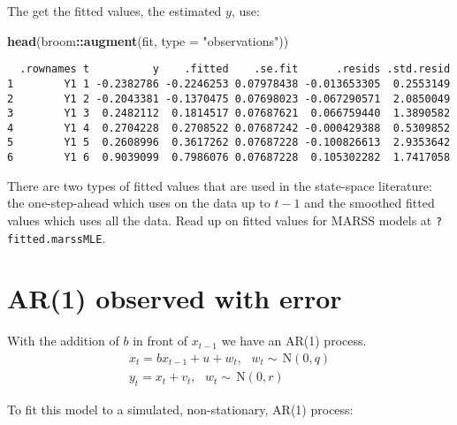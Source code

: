 \documentclass[12pt,]{book}
\newenvironment{Shaded}{\begin{snugshade}}{\end{snugshade}}
\newcommand{\DataTypeTok}[1]{\textcolor[rgb]{0.13,0.29,0.53}{#1}}
\newcommand{\KeywordTok}[1]{\textcolor[rgb]{0.13,0.29,0.53}{\textbf{#1}}}
\newcommand{\NormalTok}[1]{#1}
\newcommand{\OperatorTok}[1]{\textcolor[rgb]{0.81,0.36,0.00}{\textbf{#1}}}
\newcommand{\StringTok}[1]{\textcolor[rgb]{0.31,0.60,0.02}{#1}}
\begin{document}
The get the fitted values, the estimated \(y\), use:

\begin{Shaded}
\begin{Highlighting}[]
\KeywordTok{head}\NormalTok{(broom}\OperatorTok{::}\KeywordTok{augment}\NormalTok{(fit, }\DataTypeTok{type =} \StringTok{"observations"}\NormalTok{))}
\end{Highlighting}
\end{Shaded}

\begin{verbatim}
  .rownames t          y    .fitted    .se.fit      .resids .std.resid
1        Y1 1 -0.2382786 -0.2246253 0.07978438 -0.013653305  0.2553149
2        Y1 2 -0.2043381 -0.1370475 0.07698023 -0.067290571  2.0850049
3        Y1 3  0.2482112  0.1814517 0.07687621  0.066759440  1.3890582
4        Y1 4  0.2704228  0.2708522 0.07687242 -0.000429388  0.5309852
5        Y1 5  0.2608996  0.3617262 0.07687228 -0.100826613  2.9353642
6        Y1 6  0.9039099  0.7986076 0.07687228  0.105302282  1.7417058
\end{verbatim}

There are two types of fitted values that are used in the state-space literature: the one-step-ahead which uses on the data up to \(t-1\) and the smoothed fitted values which uses all the data. Read up on fitted values for MARSS models at \texttt{?fitted.marssMLE}.

\hypertarget{ar1-observed-with-error}{%
\section{AR(1) observed with error}\label{ar1-observed-with-error}}

With the addition of \(b\) in front of \(x_{t-1}\) we have an AR(1) process. \begin{equation}
\begin{gathered}
x_{t} = bx_{t-1} + u + w_{t}, \text{ } w_t \sim \,\text{N}(0,q)  \\
y_{t} = x_{t} + v_{t}, \text{ } w_t \sim \,\text{N}(0,r)
\end{gathered}
\end{equation}

To fit this model to a simulated, non-stationary, AR(1) process: 
\end{document}
